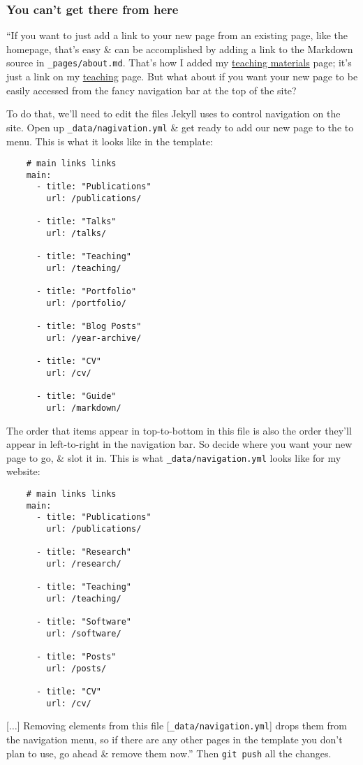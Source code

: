 \documentclass{article}
\numberwithin{equation}{section}
\begin{document}
\subsubsection{You can't get there from here}
``If you want to just add a link to your new page from an existing page, like the homepage, that's easy \& can be accomplished by adding a link to the Markdown source in \verb|_pages/about.md|. That's how I added my \href{https://jayrobwilliams.com/teaching-materials/}{teaching materials} page; it's just a link on my \href{https://jayrobwilliams.com/teaching}{teaching} page. But what about if you want your new page to be easily accessed from the fancy navigation bar at the top of the site?

To do that, we'll need to edit the files Jekyll uses to control navigation on the site. Open up \verb|_data/nagivation.yml| \& get ready to add our new page to the to menu. This is what it looks like in the template:
\begin{verbatim}
	# main links links
	main:
	  - title: "Publications"
	    url: /publications/
	
	  - title: "Talks"
	    url: /talks/    
	
	  - title: "Teaching"
	    url: /teaching/    
	    
	  - title: "Portfolio"
	    url: /portfolio/
	        
	  - title: "Blog Posts"
	    url: /year-archive/
	    
	  - title: "CV"
	    url: /cv/
	    
	  - title: "Guide"
	    url: /markdown/
\end{verbatim}
The order that items appear in top-to-bottom in this file is also the order they'll appear in left-to-right in the navigation bar. So decide where you want your new page to go, \& slot it in. This is what \verb|_data/navigation.yml| looks like for my website:
\begin{verbatim}
	# main links links
	main:
	  - title: "Publications"
	    url: /publications/
	    
	  - title: "Research"
	    url: /research/
	
	  - title: "Teaching"
	    url: /teaching/
	
	  - title: "Software"
	    url: /software/
	
	  - title: "Posts"
	    url: /posts/
	    
	  - title: "CV"
	    url: /cv/
\end{verbatim}
[$\ldots$] Removing elements from this file [\verb|_data/navigation.yml|] drops them from the navigation menu, so if there are any other pages in the template you don't plan to use, go ahead \& remove them now.'' Then \texttt{git push} all the changes.
\end{document}
